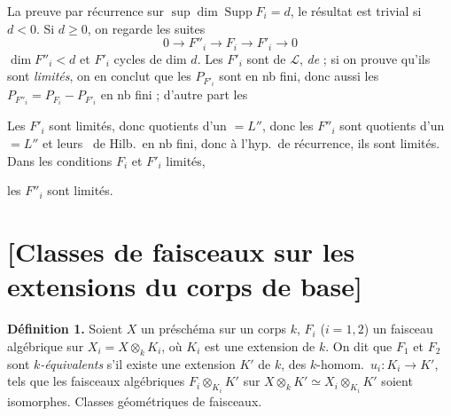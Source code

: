 \documentclass[11pt,a4paper]{article}
\begin{document}
 La preuve par récurrence  \struck{\ill{}}
sur $\sup \dim \operatorname{Supp} F_i = d$, le résultat est trivial si
$d < 0$. Si $d \ge 0$, on regarde les \struck{\ill{}} suites
\[
  0 \to F''_i \to F_i \to F'_i \to 0
\]
  $\dim F''_i < d$ et $F'_i$
\struck{\ill{} \ill{} \ill{}}  \struck{\ill{}} cycles
 de dim $d$. Les $F'_i$ sont  de
$\mathcal{L}$, \struck{\ill{}} \emph{de \ill{}} \emph{\ill{} \ill{}} ;
si on prouve qu'ils sont \emph{limités}, on en conclut que les
\struck{\ill{}} $P_{F'_i}$ sont en nb fini, donc aussi les
$P_{F''_i} = P_{F_i} - P_{F'_i}$ en nb fini ; d'autre part les \ill{}
 \ill{}

 Les $F'_i$ sont limités, donc quotients d'un \ill{}
$= L''$, donc les $F''_i$ sont quotients d'un \ill{} $= L''$ et leurs
\ de Hilb.\ en nb fini, donc \struck{\ill{} \ill{} \ill{}}
 à l'hyp.\ de récurrence, ils sont limités. Dans les
conditions $F_i$ et $F'_i$ limités,

 les $F''_i$ sont limités.

\section{[Classes de faisceaux sur les extensions du corps de base]}

\textbf{Définition 1.} Soient $X$ un préschéma  sur un corps $k$,
$F_i$  ($i = 1, 2$) un faisceau algébrique sur
$X_i = X \otimes_k K_i$, où $K_i$ est une extension de $k$. On dit que
$F_1$ et $F_2$ sont \emph{$k$-équivalents} s'il existe une extension $K'$
de $k$, des $k$-homom.\ $u_i : K_i \to K'$, tels que \struck{\ill{}} les
faisceaux algébriques $F_i \otimes_{K_i} K'$ sur
$X \otimes_k K' \simeq X_i \otimes_{K_i} K'$ soient isomorphes.
 Classes géométriques de faisceaux.
\end{document}
